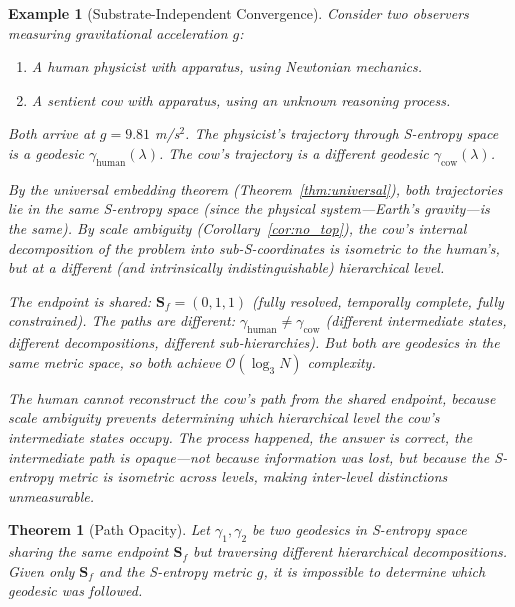 \documentclass[12pt,twocolumn]{article}
\newtheorem{theorem}{Theorem}[section]
\newtheorem{example}{Example}[section]
\begin{document}
\begin{example}[Substrate-Independent Convergence]
\label{ex:cow}
Consider two observers measuring gravitational acceleration $g$:
\begin{enumerate}
\item A human physicist with apparatus, using Newtonian mechanics.
\item A sentient cow with apparatus, using an unknown reasoning process.
\end{enumerate}

Both arrive at $g = 9.81$ m/s$^2$. The physicist's trajectory through S-entropy space is a geodesic $\gamma_{\text{human}}(\lambda)$. The cow's trajectory is a different geodesic $\gamma_{\text{cow}}(\lambda)$.

By the universal embedding theorem (Theorem~\ref{thm:universal}), both trajectories lie in the same S-entropy space (since the physical system---Earth's gravity---is the same). By scale ambiguity (Corollary~\ref{cor:no_top}), the cow's internal decomposition of the problem into sub-S-coordinates is isometric to the human's, but at a different (and intrinsically indistinguishable) hierarchical level.

The endpoint is shared: $\mathbf{S}_f = (0, 1, 1)$ (fully resolved, temporally complete, fully constrained). The paths are different: $\gamma_{\text{human}} \neq \gamma_{\text{cow}}$ (different intermediate states, different decompositions, different sub-hierarchies). But both are geodesics in the same metric space, so both achieve $\mathcal{O}(\log_3 N)$ complexity.

The human cannot reconstruct the cow's path from the shared endpoint, because scale ambiguity prevents determining which hierarchical level the cow's intermediate states occupy. The process happened, the answer is correct, the intermediate path is opaque---not because information was lost, but because the S-entropy metric is isometric across levels, making inter-level distinctions unmeasurable.
\end{example}

\begin{theorem}[Path Opacity]
\label{thm:path_opacity}
Let $\gamma_1, \gamma_2$ be two geodesics in S-entropy space sharing the same endpoint $\mathbf{S}_f$ but traversing different hierarchical decompositions. Given only $\mathbf{S}_f$ and the S-entropy metric $g$, it is impossible to determine which geodesic was followed.
\end{theorem}
\end{document}

